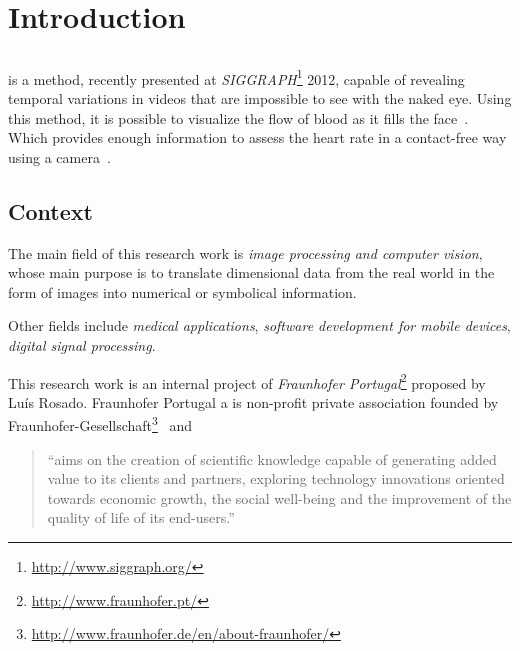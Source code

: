 \chapter{Introduction} \label{chap:intro}

\section*{}


\evm{} is a method, recently presented at
\emph{SIGGRAPH}\footnote{\url{http://www.siggraph.org/}} 2012, capable of
revealing temporal variations in videos that are impossible to see
with the naked eye. Using this method, it is possible to visualize
the flow of blood as it fills the face~\cite{Wu2012Eulerian}.
Which provides enough information to assess the heart rate in a
contact-free way using a camera~\cite{Wu2012Eulerian,
Poh2010Non, Poh2011Advancements, Philips2013}.

\section{Context} \label{sec:intro:context}


The main field of this research work is \emph{image processing
and computer vision}, whose main purpose is to translate dimensional
data from the real world in the form of images into numerical
or symbolical information.

Other fields include \emph{medical applications}, \emph{software
development for mobile devices}, \emph{digital signal processing}.

This research work is an internal project of \emph{Fraunhofer
Portugal}\footnote{\url{http://www.fraunhofer.pt/}} proposed by
Luís Rosado. Fraunhofer Portugal a is non-profit private association
founded by Fraunhofer-Gesellschaft\footnote{\url{http://www.fraunhofer.de/en/about-fraunhofer/}}~\cite{Fraunhofer2013} and

\begin{quote}
  ``aims on the creation of scientific knowledge capable of
  generating added value to its clients and partners, exploring
  technology innovations oriented towards economic growth, the
  social well-being and the improvement of the quality of life of
  its end-users.''~\cite{Fraunhofer2013}
\end{quote}

